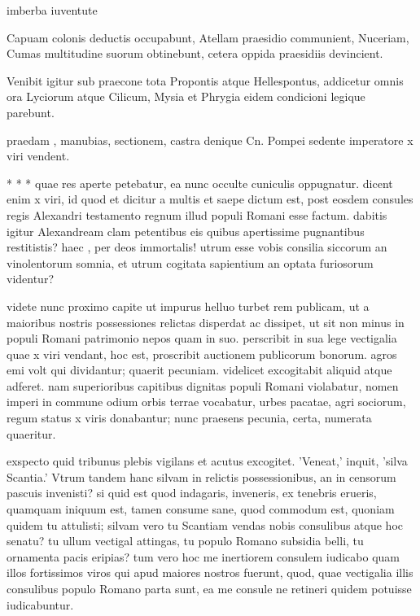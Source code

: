 
 imberba iuventute

 Capuam colonis deductis occupabunt, Atellam praesidio communient, Nuceriam, Cumas multitudine suorum obtinebunt, cetera oppida praesidiis devincient.

 Venibit igitur sub praecone tota Propontis atque Hellespontus, addicetur omnis ora Lyciorum atque Cilicum, Mysia et Phrygia eidem condicioni legique parebunt.

 praedam , manubias, sectionem, castra denique Cn. Pompei sedente imperatore x viri vendent.

 * * * quae res aperte petebatur, ea nunc occulte cuniculis oppugnatur. dicent enim x viri, id quod et dicitur a multis et saepe dictum est, post eosdem consules regis Alexandri testamento regnum illud populi Romani esse factum. dabitis igitur Alexandream clam petentibus eis quibus apertissime pugnantibus restitistis? haec , per deos immortalis! utrum esse vobis consilia siccorum an vinolentorum somnia, et utrum cogitata sapientium an optata furiosorum videntur?

 videte nunc proximo capite ut impurus helluo turbet rem publicam, ut a maioribus nostris possessiones relictas disperdat ac dissipet, ut sit non minus in populi Romani patrimonio nepos quam in suo. perscribit in sua lege vectigalia quae x viri vendant, hoc est, proscribit auctionem publicorum bonorum. agros emi volt qui dividantur; quaerit pecuniam. videlicet excogitabit aliquid atque adferet. nam superioribus capitibus dignitas populi Romani violabatur, nomen imperi in commune odium orbis terrae vocabatur, urbes pacatae, agri sociorum, regum status x viris donabantur; nunc praesens pecunia, certa, numerata quaeritur.

 exspecto quid tribunus plebis vigilans et acutus excogitet. 'Veneat,' inquit, 'silva Scantia.' Vtrum tandem hanc silvam in relictis possessionibus, an in censorum pascuis invenisti? si quid est quod indagaris, inveneris, ex tenebris erueris, quamquam iniquum est, tamen consume sane, quod commodum est, quoniam quidem tu attulisti; silvam vero tu Scantiam vendas nobis consulibus atque hoc senatu? tu ullum vectigal attingas, tu populo Romano subsidia belli, tu ornamenta pacis eripias? tum vero hoc me inertiorem consulem iudicabo quam illos fortissimos viros qui apud maiores nostros fuerunt, quod, quae vectigalia illis consulibus populo Romano parta sunt, ea me consule ne retineri quidem potuisse iudicabuntur.

